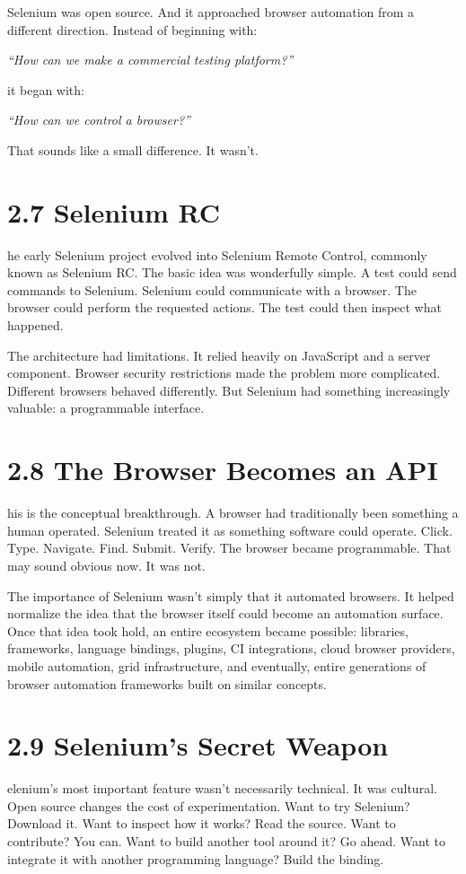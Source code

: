 \documentclass[11pt, a4paper, openany]{book}
\newcommand{\initialcap}[1]{{\fontfamily{lmss}\selectfont\huge\textbf{#1}}}
\begin{document}
Selenium was open source. And it approached browser automation from a different direction. Instead of beginning with:
\begin{center}
\textit{``How can we make a commercial testing platform?''}
\end{center}
it began with:
\begin{center}
\textit{``How can we control a browser?''}
\end{center}
That sounds like a small difference. It wasn't.

\section{2.7 Selenium RC}
\noindent \initialcap{T}he early Selenium project evolved into Selenium Remote Control, commonly known as Selenium RC. The basic idea was wonderfully simple. A test could send commands to Selenium. Selenium could communicate with a browser. The browser could perform the requested actions. The test could then inspect what happened.

The architecture had limitations. It relied heavily on JavaScript and a server component. Browser security restrictions made the problem more complicated. Different browsers behaved differently. But Selenium had something increasingly valuable: a programmable interface.

\section{2.8 The Browser Becomes an API}
\noindent \initialcap{T}his is the conceptual breakthrough. A browser had traditionally been something a human operated. Selenium treated it as something software could operate. Click. Type. Navigate. Find. Submit. Verify. The browser became programmable. That may sound obvious now. It was not.

The importance of Selenium wasn't simply that it automated browsers. It helped normalize the idea that the browser itself could become an automation surface. Once that idea took hold, an entire ecosystem became possible: libraries, frameworks, language bindings, plugins, CI integrations, cloud browser providers, mobile automation, grid infrastructure, and eventually, entire generations of browser automation frameworks built on similar concepts.

\section{2.9 Selenium's Secret Weapon}
\noindent \initialcap{S}elenium's most important feature wasn't necessarily technical. It was cultural. Open source changes the cost of experimentation. Want to try Selenium? Download it. Want to inspect how it works? Read the source. Want to contribute? You can. Want to build another tool around it? Go ahead. Want to integrate it with another programming language? Build the binding.
\end{document}

